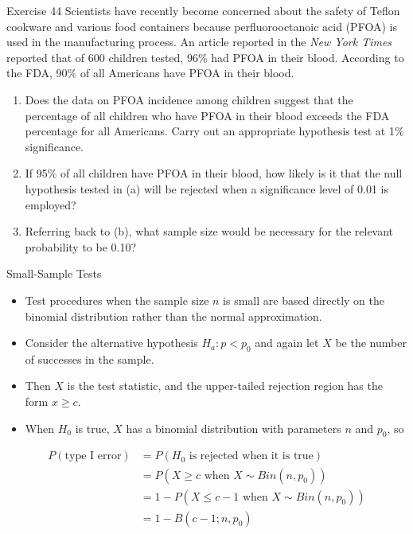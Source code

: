 \documentclass[
  ignorenonframetext,
]{beamer}
\providecommand{\tightlist}{%
  \setlength{\itemsep}{0pt}\setlength{\parskip}{0pt}}\usepackage{longtable,booktabs,array}
\begin{document}
\begin{frame}{Exercise 44}
\protect\hypertarget{exercise-44}{}
Scientists have recently become concerned about the safety of Teflon
cookware and various food containers because perfluorooctanoic acid
(PFOA) is used in the manufacturing process. An article reported in the
\emph{New York Times} reported that of 600 children tested, 96\% had
PFOA in their blood. According to the FDA, 90\% of all Americans have
PFOA in their blood.

\begin{enumerate}[<+->]
[a.]
\tightlist
\item
  Does the data on PFOA incidence among children suggest that the
  percentage of all children who have PFOA in their blood exceeds the
  FDA percentage for all Americans. Carry out an appropriate hypothesis
  test at 1\% significance.
\item
  If 95\% of all children have PFOA in their blood, how likely is it
  that the null hypothesis tested in (a) will be rejected when a
  significance level of 0.01 is employed?
\item
  Referring back to (b), what sample size would be necessary for the
  relevant probability to be 0.10?
\end{enumerate}
\end{frame}

\begin{frame}{Small-Sample Tests}
\protect\hypertarget{small-sample-tests}{}
\begin{itemize}[<+->]
\tightlist
\item
  Test procedures when the sample size \(n\) is small are based directly
  on the binomial distribution rather than the normal approximation.
\item
  Consider the alternative hypothesis \(H_{a}: p < p_{0}\) and again let
  \(X\) be the number of successes in the sample.
\item
  Then \(X\) is the test statistic, and the upper-tailed rejection
  region has the form \(x \geq c\).
\item
  When \(H_{0}\) is true, \(X\) has a binomial distribution with
  parameters \(n\) and \(p_{0}\), so
\end{itemize}

\[
\begin{aligned}
P(\text{type I error}) &= P(H_{0} \text{ is rejected when it is true}) \\
&= P(X \geq c \text{ when } X \sim Bin(n,p_{0})) \\
&= 1 - P(X \leq c - 1 \text{ when } X \sim Bin(n,p_{0})) \\
&= 1 - B(c-1;n,p_{0})
\end{aligned}
\]
\end{frame}
\end{document}
